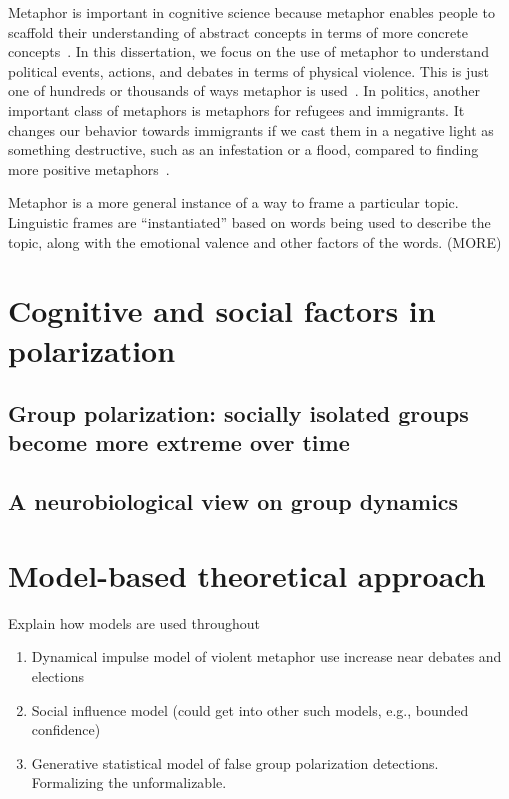 \documentclass[12pt,letterpaper]{article}
\begin{document}
Metaphor is important in cognitive science because metaphor enables people 
to scaffold their understanding of abstract concepts in terms of more concrete
concepts~\cite{Lakoff1986}. In this dissertation, we focus on the use of metaphor
to understand political events, actions, and debates in terms of physical
violence. This is just one of hundreds or thousands of ways metaphor is 
used~\cite{Dodge2015}. In politics, another important class of metaphors is
metaphors for refugees and immigrants. It changes our behavior towards 
immigrants if we cast them in a negative light as something destructive, 
such as an infestation or a flood, compared to finding more positive 
metaphors~\cite{Magaña2018}.

Metaphor is a more general instance of a way to frame a particular topic. 
Linguistic frames are ``instantiated'' based on words being used to describe the
topic, along with the emotional valence and other factors of the words. (MORE)


\section{Cognitive and social factors in polarization}


\subsection{Group polarization: socially isolated groups become more extreme over time}


\subsection{A neurobiological view on group dynamics}


\section{Model-based theoretical approach}

Explain how models are used throughout
\begin{enumerate}
  \item 
    Dynamical impulse model of violent metaphor use 
    increase near debates and elections
  \item
    Social influence model (could get into other such models, e.g., bounded confidence)
  \item
    Generative statistical model of false group polarization detections.
    Formalizing the unformalizable.
\end{enumerate}
\end{document}
